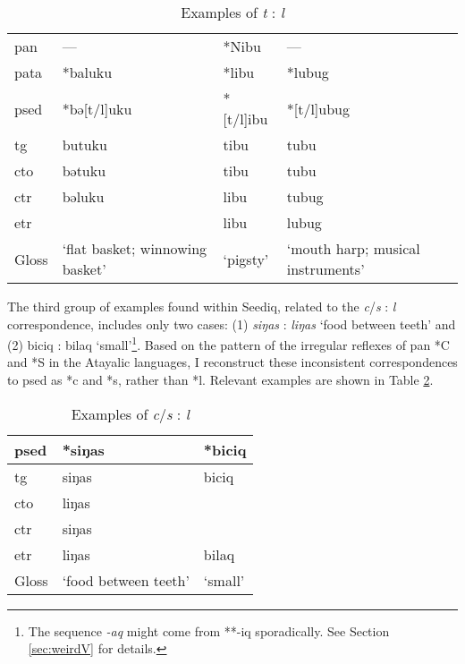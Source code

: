 \begin{table}[!htbp]
\centering
\caption{Examples of \textit{t} : \textit{l}}
\label{tab:irr_tl}
\begin{tabular}{llll}
\hline
\acs{pan}  & ---                             & *Nibu    & ---                               \\
\acs{pata} & *baluku                         & *libu    & *lubug                            \\ \hline
\ac{psed}  & *bə[t/l]uku                     & *[t/l]ibu & *[t/l]ubug                        \\ \hdashline
\ac{tg}    & butuku                          & tibu      & tubu                              \\
\ac{cto}   & bətuku                          & tibu      & tubu                              \\
\ac{ctr}   & bəluku                          & libu      & tubug                             \\
\ac{etr}   &                                 & libu      & lubug                             \\ \hline
Gloss      & `flat basket; winnowing basket' & `pigsty'  & `mouth harp; musical instruments' \\ \hline
\end{tabular}
\end{table}

The third group of examples found within Seediq, related to the \textit{c}/\textit{s} : \textit{l} correspondence, includes only two cases: (1) \textit{siŋas} : \textit{liŋas} `food between teeth' and (2) biciq : bilaq `small'\footnote{The sequence \textit{-aq} might come from **-iq sporadically. See Section \ref{sec:weirdV} for details.}. Based on the pattern of the irregular reflexes of \acl{pan} *C and *S in the Atayalic languages, I reconstruct these inconsistent correspondences to \acl{psed} as *c and *s, rather than *l. Relevant examples are shown in Table \ref{tab:irr_cls}.

\begin{table}[!htbp]
\centering
\caption{Examples of \textit{c}/\textit{s} : \textit{l}}
\label{tab:irr_cls}
\begin{tabular}{lll}
\hline
\acs{psed} & *siŋas               & *biciq  \\ \hline
\acs{tg}   & siŋas                & biciq   \\ 
\acs{cto}  & liŋas                &         \\
\acs{ctr}  & siŋas                &         \\
\acs{etr}  & liŋas                & bilaq   \\ \hline
Gloss      & `food between teeth' & `small' \\ \hline
\end{tabular}
\end{table}

